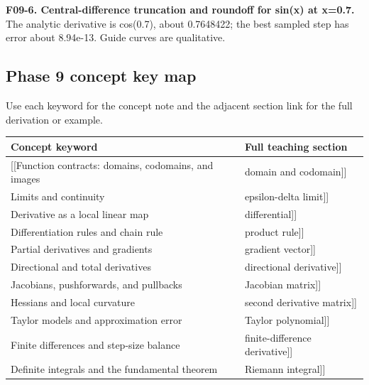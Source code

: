 \textbf{F09-6. Central-difference truncation and roundoff for sin(x) at x=0.7.} The analytic derivative is cos(0.7), about 0.7648422; the best sampled step has error about 8.94e-13. Guide curves are qualitative.

\subsection{Phase 9 concept key map}\label{phase-9-concept-key-map}

Use each keyword for the concept note and the adjacent section link for the full derivation or example.

{\def\LTcaptype{none} %
\begin{longtable}[]{@{}
  >{\raggedright\arraybackslash}p{}
  >{\raggedright\arraybackslash}p{}@{}}
\toprule\noalign{}
\begin{minipage}[b]{\linewidth}\raggedright
Concept keyword
\end{minipage} & \begin{minipage}[b]{\linewidth}\raggedright
Full teaching section
\end{minipage} \\
\midrule\noalign{}
\endhead
\bottomrule\noalign{}
\endlastfoot
{[}{[}Function contracts: domains, codomains, and images & domain and codomain{]}{]} \\
{[}{[}Limits and continuity & epsilon-delta limit{]}{]} \\
{[}{[}Derivative as a local linear map & differential{]}{]} \\
{[}{[}Differentiation rules and chain rule & product rule{]}{]} \\
{[}{[}Partial derivatives and gradients & gradient vector{]}{]} \\
{[}{[}Directional and total derivatives & directional derivative{]}{]} \\
{[}{[}Jacobians, pushforwards, and pullbacks & Jacobian matrix{]}{]} \\
{[}{[}Hessians and local curvature & second derivative matrix{]}{]} \\
{[}{[}Taylor models and approximation error & Taylor polynomial{]}{]} \\
{[}{[}Finite differences and step-size balance & finite-difference derivative{]}{]} \\
{[}{[}Definite integrals and the fundamental theorem & Riemann integral{]}{]} \\

\end{longtable}}
